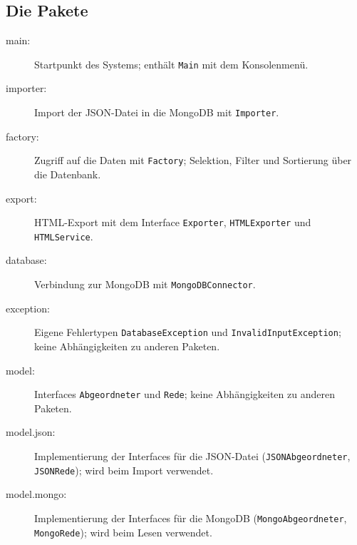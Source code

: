 
\subsection{Die Pakete}
\begin{description}
    \item[main:] Startpunkt des Systems; enthält \texttt{Main} mit dem Konsolenmenü.
    \item[importer:] Import der JSON-Datei in die MongoDB mit \texttt{Importer}.
    \item[factory:] Zugriff auf die Daten mit \texttt{Factory}; Selektion, Filter und Sortierung über die Datenbank.
    \item[export:] HTML-Export mit dem Interface \texttt{Exporter}, \texttt{HTMLExporter} und \texttt{HTMLService}.
    \item[database:] Verbindung zur MongoDB mit \texttt{MongoDBConnector}.
    \item[exception:] Eigene Fehlertypen \texttt{DatabaseException} und \texttt{InvalidInputException}; keine Abhängigkeiten zu anderen Paketen.
    \item[model:] Interfaces \texttt{Abgeordneter} und \texttt{Rede}; keine Abhängigkeiten zu anderen Paketen.
    \item[model.json:] Implementierung der Interfaces für die JSON-Datei (\texttt{JSONAbgeordneter}, \texttt{JSONRede}); wird beim Import verwendet.
    \item[model.mongo:] Implementierung der Interfaces für die MongoDB (\texttt{MongoAbgeordneter}, \texttt{MongoRede}); wird beim Lesen verwendet.
\end{description}

